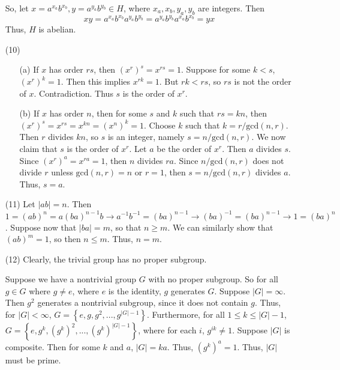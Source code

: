 \documentclass[12pt]{article}
\begin{document}
\begin{itemize}
So, let $x = a^{x_a}b^{x_b}, y = a^{y_a}b^{y_b} \in H$, where $x_a, x_b, y_a, y_b$ are integers. Then
$$xy = a^{x_a}b^{x_b}a^{y_a}b^{y_b} = a^{y_a}b^{y_b}a^{x_a}b^{x_b} = yx$$
Thus, $H$ is abelian.
\item[(10)]
\begin{itemize}
\item[(a)]
If $x$ has order $rs$, then $(x^r)^s = x^{rs} = 1$. Suppose for some $k < s$, $(x^r)^k = 1$. Then this implies $x^{rk} = 1$. But $rk < rs$, so $rs$ is not the order of $x$. Contradiction. Thus $s$ is the order of $x^r$.
\item[(b)]
If $x$ has order $n$, then for some $s$ and $k$ such that $rs = kn$, then $(x^r)^s = x^{rs} = x^{kn} = (x^n)^k = 1$. Choose $k$ such that $k = r/\text{gcd}(n, r)$. Then $r$ divides $kn$, so $s$ is an integer, namely $s = n/\text{gcd}(n,r)$. We now claim that $s$ is the order of $x^r$. Let $a$ be the order of $x^r$. Then $a$ divides $s$. Since $(x^r)^a = x^{ra} = 1$, then $n$ divides $ra$. Since $n/\text{gcd}(n,r)$ does not divide $r$ unless $\text{gcd}(n,r) = n$ or $r = 1$, then $s = n/\text{gcd}(n,r)$ divides $a$. Thus, $s = a$.
\end{itemize}
\item[(11)]
Let $|ab| = n$. Then $1 = (ab)^n = a(ba)^{n-1}b \rightarrow a^{-1}b^{-1} = (ba)^{n-1} \rightarrow (ba)^{-1} = (ba)^{n-1} \rightarrow 1 = (ba)^n$. Suppose now that $|ba| = m$, so that $n \geq m$. We can similarly show that $(ab)^m = 1$, so then $n \leq m$. Thus, $n = m$.
\item[(12)]
Clearly, the trivial group has no proper subgroup.

Suppose we have a nontrivial group $G$ with no proper subgroup. So for all $g \in G$ where $g \neq e$, where $e$ is the identity, $g$ generates $G$. Suppose $|G| = \infty$. Then $g^2$ generates a nontrivial subgroup, since it does not contain $g$. Thus, for $|G| < \infty$, $G = \left\lbrace e, g, g^2, ..., g^{|G| - 1} \right\rbrace$. Furthermore, for all $1 \leq k \leq |G| - 1$, $G = \left\lbrace e, g^k, (g^k)^2, ..., (g^k)^{|G|-1} \right\rbrace$, where for each $i$, $g^{ik} \neq 1$. Suppose $|G|$ is composite. Then for some $k$ and $a$, $|G| = ka$. Thus, $(g^k)^a = 1$. Thus, $|G|$ must be prime.


\end{itemize}
\end{document}
